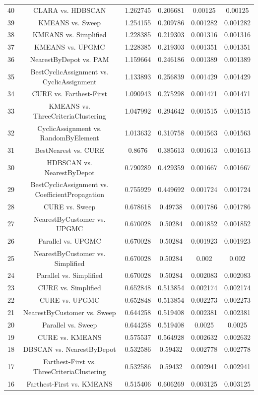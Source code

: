 \documentclass[a4paper,10pt]{article}
\begin{document}
\begin{landscape}
\begin{table}[!htp]
\begin{tabular}{cccccc}
40&CLARA vs. HDBSCAN&1.262745&0.206681&0.00125&0.00125\\
39&KMEANS vs. Sweep&1.254155&0.209786&0.001282&0.001282\\
38&KMEANS vs. Simplified&1.228385&0.219303&0.001316&0.001316\\
37&KMEANS vs. UPGMC&1.228385&0.219303&0.001351&0.001351\\
36&NearestByDepot vs. PAM&1.159664&0.246186&0.001389&0.001389\\
35&BestCyclicAssignment vs. CyclicAssignment&1.133893&0.256839&0.001429&0.001429\\
34&CURE vs. Farthest-First&1.090943&0.275298&0.001471&0.001471\\
33&KMEANS vs. ThreeCriteriaClustering&1.047992&0.294642&0.001515&0.001515\\
32&CyclicAssignment vs. RandomByElement&1.013632&0.310758&0.001563&0.001563\\
31&BestNearest vs. CURE&0.8676&0.385613&0.001613&0.001613\\
30&HDBSCAN vs. NearestByDepot&0.790289&0.429359&0.001667&0.001667\\
29&BestCyclicAssignment vs. CoefficientPropagation&0.755929&0.449692&0.001724&0.001724\\
28&CURE vs. Sweep&0.678618&0.49738&0.001786&0.001786\\
27&NearestByCustomer vs. UPGMC&0.670028&0.50284&0.001852&0.001852\\
26&Parallel vs. UPGMC&0.670028&0.50284&0.001923&0.001923\\
25&NearestByCustomer vs. Simplified&0.670028&0.50284&0.002&0.002\\
24&Parallel vs. Simplified&0.670028&0.50284&0.002083&0.002083\\
23&CURE vs. Simplified&0.652848&0.513854&0.002174&0.002174\\
22&CURE vs. UPGMC&0.652848&0.513854&0.002273&0.002273\\
21&NearestByCustomer vs. Sweep&0.644258&0.519408&0.002381&0.002381\\
20&Parallel vs. Sweep&0.644258&0.519408&0.0025&0.0025\\
19&CURE vs. KMEANS&0.575537&0.564928&0.002632&0.002632\\
18&DBSCAN vs. NearestByDepot&0.532586&0.59432&0.002778&0.002778\\
17&Farthest-First vs. ThreeCriteriaClustering&0.532586&0.59432&0.002941&0.002941\\
16&Farthest-First vs. KMEANS&0.515406&0.606269&0.003125&0.003125\\

\end{tabular}
\end{table}
\end{landscape}
\end{document}
